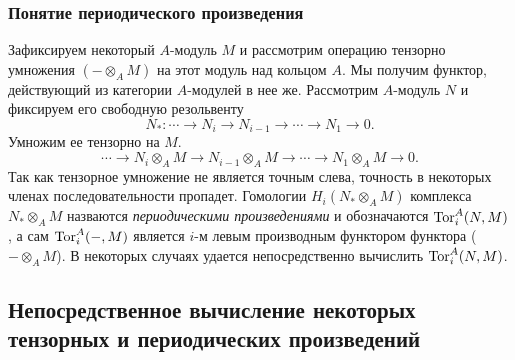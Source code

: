     \subsubsection{Понятие периодического произведения}
    Зафиксируем некоторый $A$-модуль $M$ и рассмотрим операцию тензорно умножения $(-\otimes_A M)$ на этот модуль над кольцом $A$. 
    Мы получим функтор, действующий из категории $A$-модулей в нее же. Рассмотрим $A$-модуль $N$ и фиксируем его свободную резольвенту 
    \begin{equation*}
        N_* : \cdots \rightarrow N_i \rightarrow N_{i-1} \rightarrow \cdots \rightarrow N_1 \rightarrow 0.
    \end{equation*}
    Умножим ее тензорно на $M$.
    \begin{equation*}
        \cdots \rightarrow N_i \otimes_A M \rightarrow N_{i-1} \otimes_A M \rightarrow \cdots \rightarrow N_1 \otimes_A M \rightarrow 0.
    \end{equation*}
    Так как тензорное умножение не является точным слева, точность в некоторых членах последовательности пропадет. 
    Гомологии $H_i(N_* \otimes_A M)$ комплекса $N_* \otimes_A M$ назваются \textit{периодическими 
    произведениями} и обозначаются $\textup{Tor}_i^A(N, M)$, а сам $\textup{Tor}_i^A(-, M)$ является $i$-м левым производным функтором функтора ($- \otimes_A M$). 
    В некоторых случаях удается непосредственно вычислить $\textup{Tor}_i^A(N, M)$. 

    \subsection{Непосредственное вычисление некоторых тензорных и периодических произведений}

